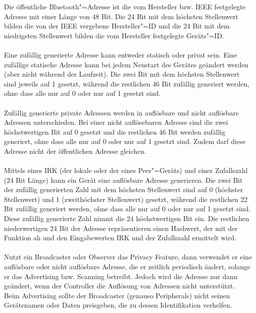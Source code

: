 Die öffentliche Bluetooth"=Adresse ist die vom Hersteller bzw. IEEE festgelegte Adresse mit einer Länge von 48 Bit. Die 24 Bit mit dem höchsten Stellenwert bilden die von der IEEE vergebene Hersteller"=ID und die 24 Bit mit dem niedrigsten Stellenwert bilden die vom Hersteller festgelegte Geräts"=ID. \cite{BtSpec4.2_2576}
\\\\
Eine zufällig generierte Adresse kann entweder statisch oder privat sein. Eine zufällige statische Adresse kann bei jedem Neustart des Gerätes geändert werden (aber nicht während der Laufzeit). Die zwei Bit mit dem höchsten Stellenwert sind jeweils auf 1 gesetzt, während die restlichen 46 Bit zufällig generiert werden, ohne dass alle nur auf 0 oder nur auf 1 gesetzt sind.
\\\\
Zufällig generierte private Adressen werden in auflösbare und nicht auflösbare Adressen unterschieden. Bei einer nicht auflösebaren Adresse sind die zwei höchstwertigen Bit auf 0 gesetzt und die restlichen 46 Bit werden zufällig generiert, ohne dass alle nur auf 0 oder nur auf 1 gesetzt sind. Zudem darf diese Adresse nicht der öffentlichen Adresse gleichen.
\\\\
Mittels eines IRK (der lokale oder der eines Peer"=Geräts) und einer Zufallszahl (24 Bit Länge) kann ein Gerät eine auflösbare Adresse generieren. Die zwei Bit der zufällig generierten Zahl mit dem höchsten Stellenwert sind auf 0 (höchster Stellenwert) und 1 (zweithöchster Stellenwert) gesetzt, während die restlichen 22 Bit zufällig generiert werden, ohne dass alle nur auf 0 oder nur auf 1 gesetzt sind. Diese zufällig generierte Zahl nimmt die 24 höchstwertigen Bit ein. Die restlichen niederwertigen 24 Bit der Adresse repräsentieren einen Hashwert, der mit der Funktion ah \cite{BtSpec4.2_2287} 
und den Eingabewerten IRK und der Zufallszahl ermittelt wird. \cite{BtSpec4.2_2577-2579}
\\\\
Nutzt ein Broadcaster oder Observer das Privacy Feature, dann verwendet er eine auflösbare oder nicht auflösbare Adresse, die er zeitlich periodisch ändert, solange er das Advertising bzw. Scanning betreibt. Jedoch wird die Adresse nur dann geändert, wenn der Controller die Auflösung von Adressen nicht unterstützt. Beim Advertising sollte der Broadcaster (genauso Peripherals) nicht seinen Gerätenamen oder Daten preisgeben, die zu dessen Identifikation verhelfen. \cite{BtSpec4.2_2078-2079}
